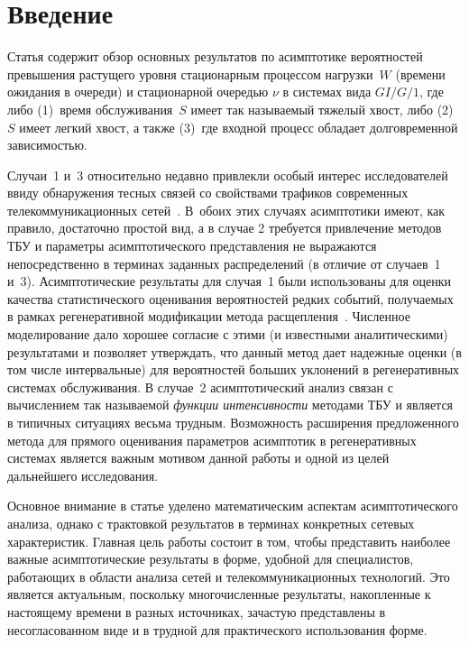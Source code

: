 \begin{multicols}{2}

 \label{st\stat}


\section{Введение}

Статья содержит обзор основных результатов по асимптотике
вероятностей превышения растущего уровня стационарным процессом
нагрузки~$W$ (времени ожидания в очереди) и стационарной оче\-редью
$\nu$ в системах вида $GI/G/1$, где либо (1)~время обслуживания~$S$
имеет так называемый тяжелый хвост, либо (2)~$S$ имеет легкий хвост,
а также (3)~где входной процесс обладает долговременной
зависимостью.

Случаи~1 и~3 относительно недавно привлекли особый
интерес исследователей ввиду обнаружения тесных связей со свойствами
трафиков современных телекоммуникационных сетей~\cite {Will}. В~обоих
этих случаях асимптотики имеют, как правило, достаточно
простой вид, а в случае 2 требуется привлечение методов ТБУ и
параметры асимптотического представления не выражаются
непосредственно в терминах заданных распределений (в отличие от
случаев~1 и~3). Асимптотические результаты для случая~1 были
использованы для оценки качества статистического оценивания
вероятностей редких событий, получаемых в рамках регенеративной
модификации метода расщепления~\cite{BorMor}. Численное
моделирование дало хорошее согласие с этими (и известными
аналитическими) результатами и позволяет утверждать, что данный
метод дает надежные оценки (в том числе интервальные) для
вероятностей больших уклонений в регенеративных системах
обслуживания. В случае~2 асимптотический анализ связан с
вычислением так называемой {\it функции интенсивности} методами ТБУ
и является в типичных ситуациях весьма трудным. Возможность
расширения предложенного метода для прямого оценивания параметров
асимптотик в регенеративных системах является важным мотивом данной
работы и одной из целей дальнейшего исследования.

Основное внимание в статье уделено математическим аспектам
 асимптотического анализа, однако с трактовкой результатов в терминах конкретных
сетевых характеристик. Главная цель работы состоит в том, чтобы
представить наиболее важные асимптотические результаты в форме,
удобной для специалистов, работающих в области анализа сетей и
телекоммуникационных технологий. Это является актуальным, поскольку
многочисленные результаты, накопленные к настоящему времени в разных
источниках, зачастую представлены в несогласованном виде и в
трудной для практического использования форме.


\end{multicols}
